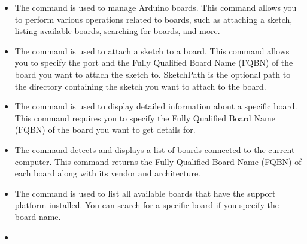 \begin{itemize}
	
	\item {}
	
	The command  is used to manage Arduino boards. This command allows you to perform various operations related to boards, such as attaching a sketch, listing available boards, searching for boards, and more.
	
	
	\item{}
	
	The command  is used to attach a sketch to a board. This command allows you to specify the port and the Fully Qualified Board Name (FQBN) of the board you want to attach the sketch to. SketchPath is the optional path to the directory containing the sketch you want to attach to the board.
	
	
	
	\item {}
	
	The command  is used to display detailed information about a specific board. This command requires you to specify the Fully Qualified Board Name (FQBN) of the board you want to get details for.
	
	
	\item {}
	
	The command  detects and displays a list of boards connected to the current computer. This command returns the Fully Qualified Board Name (FQBN) of each board along with its vendor and architecture.
	
	
	\item {}
	
	The command  is used to list all available boards  that have the support platform installed. You can search for a specific board if you specify the board name.
	
	
	\item {}
	

\end{itemize}
